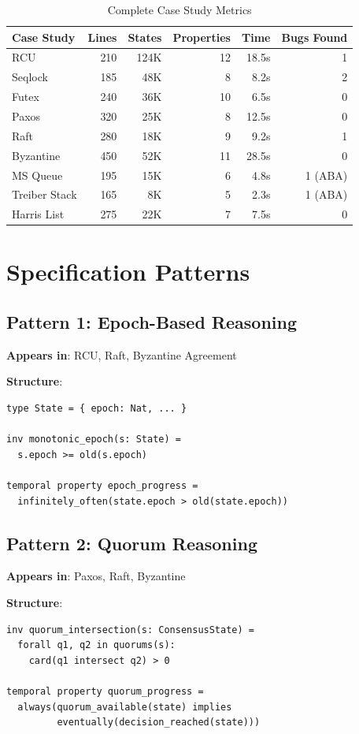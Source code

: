 \documentclass[conference]{IEEEtran}
\begin{document}
\begin{table}[t]
\centering
\caption{Complete Case Study Metrics}
\begin{tabular}{lrrrrr}
\toprule
\textbf{Case Study} & \textbf{Lines} & \textbf{States} & \textbf{Properties} & \textbf{Time} & \textbf{Bugs Found} \\
\midrule
RCU & 210 & 124K & 12 & 18.5s & 1 \\
Seqlock & 185 & 48K & 8 & 8.2s & 2 \\
Futex & 240 & 36K & 10 & 6.5s & 0 \\
Paxos & 320 & 25K & 8 & 12.5s & 0 \\
Raft & 280 & 18K & 9 & 9.2s & 1 \\
Byzantine & 450 & 52K & 11 & 28.5s & 0 \\
MS Queue & 195 & 15K & 6 & 4.8s & 1 (ABA) \\
Treiber Stack & 165 & 8K & 5 & 2.3s & 1 (ABA) \\
Harris List & 275 & 22K & 7 & 7.5s & 0 \\
\bottomrule
\end{tabular}
\end{table}

\section{Specification Patterns}

\subsection{Pattern 1: Epoch-Based Reasoning}

\textbf{Appears in}: RCU, Raft, Byzantine Agreement

\textbf{Structure}:
\begin{lstlisting}
type State = { epoch: Nat, ... }

inv monotonic_epoch(s: State) =
  s.epoch >= old(s.epoch)

temporal property epoch_progress =
  infinitely_often(state.epoch > old(state.epoch))
\end{lstlisting}

\subsection{Pattern 2: Quorum Reasoning}

\textbf{Appears in}: Paxos, Raft, Byzantine

\textbf{Structure}:
\begin{lstlisting}
inv quorum_intersection(s: ConsensusState) =
  forall q1, q2 in quorums(s):
    card(q1 intersect q2) > 0

temporal property quorum_progress =
  always(quorum_available(state) implies
         eventually(decision_reached(state)))
\end{lstlisting}
\end{document}

